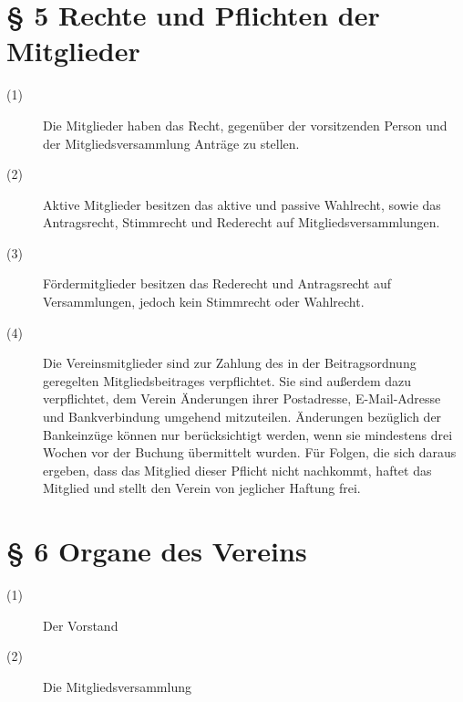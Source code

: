 \documentclass[a4paper,12pt]{scrartcl}
\begin{document}
\section*{\S{} 5 Rechte und Pflichten der Mitglieder}
\begin{description} 

\item[(1)] Die Mitglieder haben das Recht, gegenüber der vorsitzenden Person und der Mitgliedsversammlung Anträge zu stellen.
\item[(2)] Aktive Mitglieder besitzen das aktive und passive Wahlrecht, sowie das Antragsrecht, Stimmrecht und Rederecht auf Mitgliedsversammlungen.
\item[(3)] Fördermitglieder besitzen das Rederecht und Antragsrecht auf Versammlungen, jedoch kein Stimmrecht oder Wahlrecht.
\item[(4)] Die Vereinsmitglieder sind zur Zahlung des in der Beitragsordnung geregelten Mitgliedsbeitrages verpflichtet. Sie sind außerdem dazu verpflichtet, dem Verein Änderungen ihrer Postadresse, E-Mail-Adresse und Bankverbindung umgehend mitzuteilen. Änderungen bezüglich der Bankeinzüge können nur berücksichtigt werden, wenn sie mindestens drei Wochen vor der Buchung übermittelt wurden. Für Folgen, die sich daraus ergeben, dass das Mitglied dieser Pflicht nicht nachkommt, haftet das Mitglied und stellt den Verein von jeglicher Haftung frei.

\end{description}



\section*{\S{} 6 Organe des Vereins}
\begin{description} 

\item[(1)] Der Vorstand
\item[(2)] Die Mitgliedsversammlung

\end{description}
\end{document}
